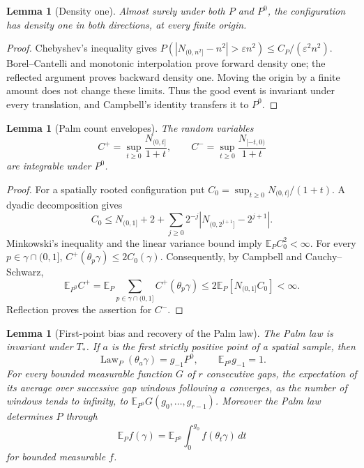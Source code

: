 \documentclass[11pt,reqno]{amsart}
\numberwithin{equation}{section}
\newtheorem{lemma}[theorem]{Lemma}
\theoremstyle{definition}
\newcommand{\E}{\mathbb E}
\newcommand{\1}{\mathbf 1}
\newcommand{\dd}{\,d}
\begin{document}
\begin{lemma}[Density one]\label{pre:density}
Almost surely under both $P$ and $P^0$, the configuration has density
one in both directions, at every finite origin.
\end{lemma}

\begin{proof}
Chebyshev's inequality gives
$P(|N_{(0,n^2]}-n^2|>\varepsilon n^2)\le C_P/(\varepsilon^2n^2)$.
Borel--Cantelli and monotonic interpolation prove forward density one;
the reflected argument proves backward density one. Moving the origin
by a finite amount does not change these limits. Thus the good event
is invariant under every translation, and Campbell's identity
transfers it to $P^0$.
\end{proof}

\begin{lemma}[Palm count envelopes]\label{pre:envelopes}
The random variables
\[
C^+=\sup_{t\ge0}\frac{N_{(0,t]}}{1+t},\qquad
C^-=\sup_{t\ge0}\frac{N_{[-t,0)}}{1+t}
\]
are integrable under $P^0$.
\end{lemma}

\begin{proof}
For a spatially rooted configuration put
$C_0=\sup_{t\ge0}N_{(0,t]}/(1+t)$. A dyadic decomposition gives
\[
C_0\le N_{(0,1]}+2+
\sum_{j\ge0}2^{-j}|N_{(0,2^{j+1}]}-2^{j+1}|.
\]
Minkowski's inequality and the linear variance bound imply
$\E_PC_0^2<\infty$. For every $p\in\gamma\cap(0,1]$,
$C^+(\theta_p\gamma)\le2C_0(\gamma)$. Consequently, by Campbell and
Cauchy--Schwarz,
\[
\E_{P^0}C^+
=\E_P\sum_{p\in\gamma\cap(0,1]}C^+(\theta_p\gamma)
\le2\E_P[N_{(0,1]}C_0]<\infty.
\]
Reflection proves the assertion for $C^-$.
\end{proof}

\begin{lemma}[First-point bias and recovery of the Palm law]
\label{pre:palm-identification}
The Palm law is invariant under $T_*$. If $a$ is the first strictly
positive point of a spatial sample, then
\begin{equation}\label{pre:first-point}
\operatorname{Law}_P(\theta_a\gamma)
=g_{-1}P^0,\qquad \E_{P^0}g_{-1}=1.
\end{equation}
For every bounded measurable function $G$ of $r$ consecutive gaps,
the expectation of its average over successive gap windows following
$a$ converges, as the number of windows tends to infinity, to
$\E_{P^0}G(g_0,\ldots,g_{r-1})$.
Moreover the Palm law determines $P$ through
\begin{equation}\label{pre:inversion}
\E_P f(\gamma)
=\E_{P^0}\int_0^{g_0}f(\theta_t\gamma)\dd t
\end{equation}
for bounded measurable $f$.
\end{lemma}
\end{document}
